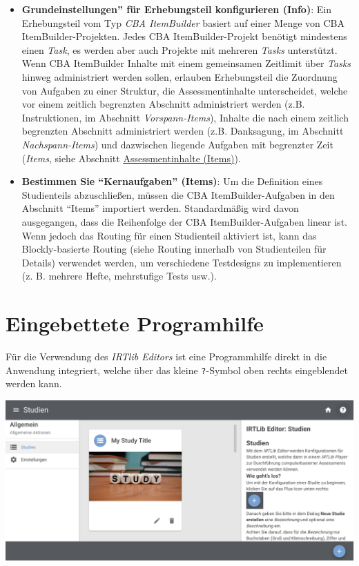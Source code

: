 \documentclass[
  letterpaper,
  DIV=11]{scrreprt}
\begin{document}
\begin{itemize}
\item
  \textbf{Grundeinstellungen'' für Erhebungsteil konfigurieren (Info)}:
  Ein Erhebungsteil vom Typ \emph{CBA ItemBuilder} basiert auf einer
  Menge von CBA ItemBuilder-Projekten. Jedes CBA ItemBuilder-Projekt
  benötigt mindestens einen \emph{Task}, es werden aber auch Projekte
  mit mehreren \emph{Tasks} unterstützt. Wenn CBA ItemBuilder Inhalte
  mit einem gemeinsamen Zeitlimit über \emph{Tasks} hinweg administriert
  werden sollen, erlauben Erhebungsteil die Zuordnung von Aufgaben zu
  einer Struktur, die Assessmentinhalte unterscheidet, welche vor einem
  zeitlich begrenzten Abschnitt administriert werden (z.B.
  Instruktionen, im Abschnitt \emph{Vorspann-Items}), Inhalte die nach
  einem zeitlich begrenzten Abschnitt administriert werden (z.B.
  Danksagung, im Abschnitt \emph{Nachspann-Items}) und dazwischen
  liegende Aufgaben mit begrenzter Zeit (\emph{Items}, siehe Abschnitt
  \protect\hyperlink{assessmentinhalte-items}{Assessmentinhalte
  (Items)}).
\item
  \textbf{Bestimmen Sie ``Kernaufgaben'' (Items)}: Um die Definition
  eines Studienteils abzuschließen, müssen die CBA ItemBuilder-Aufgaben
  in den Abschnitt ``Items'' importiert werden. Standardmäßig wird davon
  ausgegangen, dass die Reihenfolge der CBA ItemBuilder-Aufgaben linear
  ist. Wenn jedoch das Routing für einen Studienteil aktiviert ist, kann
  das Blockly-basierte Routing (siehe Routing innerhalb von
  Studienteilen für Details) verwendet werden, um verschiedene
  Testdesigns zu implementieren (z. B. mehrere Hefte, mehrstufige Tests
  usw.).
\end{itemize}

\hypertarget{sec-embedded-help}{%
\section{Eingebettete Programhilfe}\label{sec-embedded-help}}

Für die Verwendung des \emph{IRTlib Editors} ist eine Programmhilfe
direkt in die Anwendung integriert, welche über das kleine
\texttt{?}-Symbol oben rechts eingeblendet werden kann.

\includegraphics[width=1\textwidth,height=\textheight]{img/screenshot-editor-embedded-help-de-DEU.png}
\end{document}
